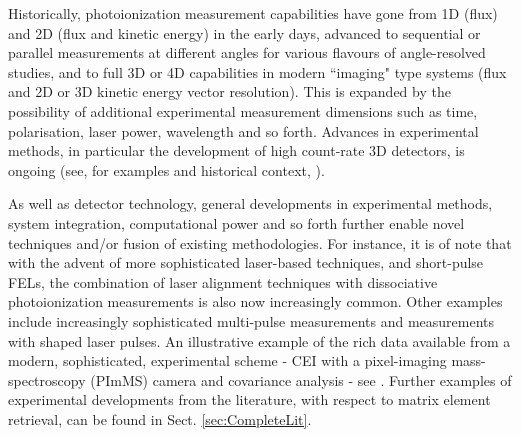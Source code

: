\documentclass[10pt]{article}
\begin{document}
Historically, photoionization measurement capabilities have gone from 1D (flux) and 2D (flux and kinetic energy) in the early days, advanced to sequential or parallel measurements at different angles for various flavours of angle-resolved studies, and to full 3D or 4D capabilities in modern ``imaging" type systems (flux and 2D or 3D kinetic energy vector resolution). This is expanded by the possibility of additional experimental measurement dimensions such as time, polarisation, laser power, wavelength and so forth. Advances in experimental methods, in particular the development of high count-rate 3D detectors, is ongoing (see, for examples and historical context, \cite{Parker1997,Dorner1997a,Continetti2001,Vallance2013,chandler2017PerspectiveAdvancedParticle}). 

As well as detector technology, general developments in experimental methods, system integration, computational power and so forth further enable novel techniques and/or fusion of existing methodologies. For instance, it is of note that with the advent of more sophisticated laser-based techniques, and short-pulse FELs, the combination of laser alignment techniques with dissociative photoionization measurements is also now increasingly common. Other examples include increasingly sophisticated multi-pulse measurements and measurements with shaped laser pulses. An illustrative example of the rich data available from a modern, sophisticated, experimental scheme - CEI with a pixel-imaging mass-spectroscopy (PImMS) camera and covariance analysis - see \cite{Slater2015}. Further examples of experimental developments from the literature, with respect to matrix element retrieval, can be found in Sect. \ref{sec:CompleteLit}.





\end{document}
